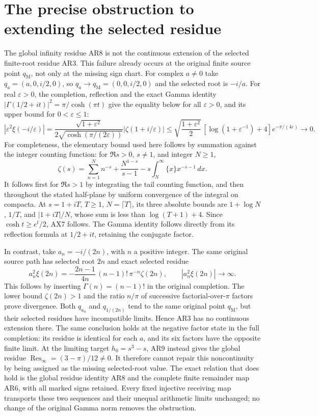 \documentclass[11pt]{article}
\begin{document}
\section{The precise obstruction to extending the selected residue}
The global infinity residue AR8 is not the continuous extension
of the selected finite-root residue AR3. This failure already
occurs at the original finite source point $q_{\mathrm M}$,
not only at the missing sign chart. For complex $a\ne0$ take
$q_a=(a,0,i/2,0)$, so $q_a\to q_{\mathrm M}=(0,0,i/2,0)$
and the selected root is $-i/a$. For real $\varepsilon>0$,
the completion, reflection and the exact Gamma identity
$|\Gamma(1/2+it)|^2=\pi/\cosh(\pi t)$ give the equality
below for all $\varepsilon>0$, and its upper bound for
$0<\varepsilon\le1$:
\begin{equation}
\left|\varepsilon^2\xi(-i/\varepsilon)\right|
=\frac{\sqrt{1+\varepsilon^2}}
       {2\sqrt{\cosh(\pi/(2\varepsilon))}}
 |\zeta(1+i/\varepsilon)|
\le\sqrt{\frac{1+\varepsilon^2}{2}}\,
 [\log(1+\varepsilon^{-1})+4]e^{-\pi/(4\varepsilon)}
\longrightarrow0 .
\tag{AX7}
\end{equation}
For completeness, the elementary bound used here follows by
summation against the integer counting function: for $\Re s>0$,
$s\ne1$, and integer $N\ge1$,
\[
\zeta(s)=\sum_{n=1}^{N}n^{-s}
       +\frac{N^{1-s}}{s-1}
       -s\int_N^\infty\{x\}x^{-s-1}\,dx .
\]
It follows first for $\Re s>1$ by integrating the tail counting
function, and then throughout the stated half-plane by uniform
convergence of the integral on compacta. At $s=1+iT$, $T\ge1$,
$N=\lceil T\rceil$, its three absolute bounds are
$1+\log N$, $1/T$, and $|1+iT|/N$, whose sum is less than
$\log(T+1)+4$. Since $\cosh t\ge e^t/2$, AX7 follows.
The Gamma identity follows directly from its reflection
formula at $1/2+it$, retaining the conjugate factor.

In contrast, take $a_n=-i/(2n)$, with $n$ a positive integer.
The same original source path has selected root $2n$ and
exact selected residue
\begin{equation}
a_n^2\xi(2n)
=-\frac{2n-1}{4n}\,(n-1)!\,\pi^{-n}\zeta(2n),
\qquad |a_n^2\xi(2n)|\longrightarrow\infty.
\tag{AX8}
\end{equation}
This follows by inserting $\Gamma(n)=(n-1)!$ in the original
completion. The lower bound $\zeta(2n)>1$ and the ratio
$n/\pi$ of successive factorial-over-$\pi$ factors prove
divergence. Both $q_{a_n}$ and $q_{1/(2n)}$ tend to the
same original point $q_{\mathrm M}$, but their selected
residues have incompatible limits. Hence AR3 has no continuous
extension there. The same conclusion holds at the negative
factor state in the full completion: its residue is identical
for each $a$, and its six factors have the opposite finite limit.
At the limiting target $h_0=s^3-s$, AR9 instead gives the
global residue $\operatorname{Res}_\infty=(3-\pi)/12\ne0$.
It therefore cannot repair this noncontinuity by being assigned
as the missing selected-root value. The exact relation that
does hold is the global residue identity AR8 and the complete
finite remainder map AR6, with all marked signs retained.
Every fixed injective receiving map transports these two
sequences and their unequal arithmetic limits unchanged;
no change of the original Gamma norm removes the obstruction.
\end{document}
